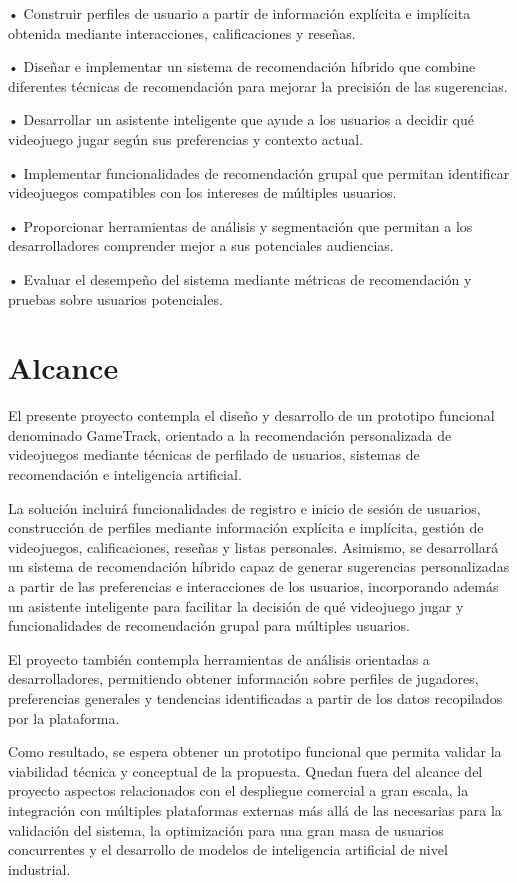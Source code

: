 • Construir perfiles de usuario a partir de información explícita e implícita obtenida mediante interacciones, calificaciones y reseñas.

• Diseñar e implementar un sistema de recomendación híbrido que combine diferentes técnicas de recomendación para mejorar la precisión de las sugerencias.

• Desarrollar un asistente inteligente que ayude a los usuarios a decidir qué videojuego jugar según sus preferencias y contexto actual.

• Implementar funcionalidades de recomendación grupal que permitan identificar videojuegos compatibles con los intereses de múltiples usuarios.

• Proporcionar herramientas de análisis y segmentación que permitan a los desarrolladores comprender mejor a sus potenciales audiencias.

• Evaluar el desempeño del sistema mediante métricas de recomendación y pruebas sobre usuarios potenciales.

\section{Alcance}\label{sec:alcance}

El presente proyecto contempla el diseño y desarrollo de un prototipo funcional denominado GameTrack, orientado a la recomendación personalizada de videojuegos mediante técnicas de perfilado de usuarios, sistemas de recomendación e inteligencia artificial.

La solución incluirá funcionalidades de registro e inicio de sesión de usuarios, construcción de perfiles mediante información explícita e implícita, gestión de videojuegos, calificaciones, reseñas y listas personales. Asimismo, se desarrollará un sistema de recomendación híbrido capaz de generar sugerencias personalizadas a partir de las preferencias e interacciones de los usuarios, incorporando además un asistente inteligente para facilitar la decisión de qué videojuego jugar y funcionalidades de recomendación grupal para múltiples usuarios.

El proyecto también contempla herramientas de análisis orientadas a desarrolladores, permitiendo obtener información sobre perfiles de jugadores, preferencias generales y tendencias identificadas a partir de los datos recopilados por la plataforma.

Como resultado, se espera obtener un prototipo funcional que permita validar la viabilidad técnica y conceptual de la propuesta. Quedan fuera del alcance del proyecto aspectos relacionados con el despliegue comercial a gran escala, la integración con múltiples plataformas externas más allá de las necesarias para la validación del sistema, la optimización para una gran masa de usuarios concurrentes y el desarrollo de modelos de inteligencia artificial de nivel industrial.
